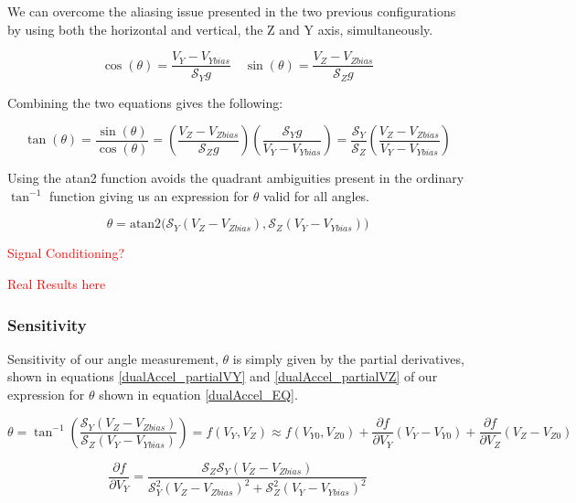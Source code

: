 \documentclass{article}
\newcommand{\xxx}[1]{\textcolor{red}{#1}}
\theoremstyle{plain}
\theoremstyle{definition}
\theoremstyle{remark}
\newcommand{\Sens}{\mathcal{S}}
\begin{document}
We can overcome the aliasing issue  presented in the two previous configurations by using both the horizontal and vertical, the Z and Y axis, simultaneously.  

$$ \cos(\theta) = \frac{V_Y-V_{Ybias}}{\Sens_{Y} g} \quad \sin(\theta) = \frac{V_{Z} - V_{Zbias}}{\Sens_{Z} g} $$

Combining the two equations gives the following:

$$ \tan(\theta) = \frac{\sin(\theta)}{\cos(\theta)} = \left(\frac{V_{Z} - V_{Zbias}}{\Sens_{Z} g}\right) \left( \frac{\Sens_{Y} g}{V_Y-V_{Ybias}} \right) = \frac{\Sens_{Y}}{\Sens_{Z}} \left( \frac{V_{Z} - V_{Zbias}}{V_{Y} - V_{Ybias}} \right)$$

Using the atan2 function avoids the quadrant ambiguities present in the ordinary $\tan^{-1}$ function giving us an expression for $\theta$ valid for all angles.

$$\theta = \text{atan2}\big( \Sens_{Y} \left( V_{Z} - V_{Zbias}\right),  \Sens_{Z} \left( V_{Y} - V_{Ybias}\right) \big)$$

\xxx{Signal Conditioning?}

\xxx{Real Results here}

\subsubsection{Sensitivity}

Sensitivity of our angle measurement, $\theta$ is simply given by the partial derivatives, shown in equations \ref{dualAccel_partialVY} and \ref{dualAccel_partialVZ} of our expression for $\theta$ shown in equation \ref{dualAccel_EQ}.

\begin{equation}
\theta = \tan^{-1} \left( \frac{\Sens_{Y} \left( V_{Z} - V_{Zbias}\right)}{\Sens_{Z} \left( V_{Y} - V_{Ybias}\right)} \right) = f(V_{Y},V_{Z}) \approx f(V_{Y0},V_{Z0}) + \frac{\partial f}{\partial V_{Y}} \left( V_Y - V_{Y0} \right) + \frac{\partial f}{\partial V_Z} \left( V_Z - V_{Z0}\right)  
\label{dualAccel_EQ}
\end{equation}

\begin{equation}
\frac{\partial f}{\partial V_{Y}} = \frac{\Sens_Z \Sens_Y \left(V_{Z} - V_{Zbias} \right)}{\Sens^2_Y \left(V_Z - V_{Zbias} \right) ^2 + \Sens^2_Z \left( V_Y - V_{Ybias}\right)^2}
\label{dualAccel_partialVY}
\end{equation}
\end{document}
